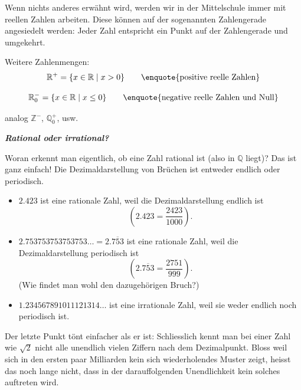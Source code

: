Wenn nichts anderes erwähnt wird, werden wir in der Mittelschule immer mit reellen Zahlen arbeiten. Diese können auf der sogenannten Zahlengerade angesiedelt werden: Jeder Zahl entspricht ein Punkt auf der Zahlengerade und umgekehrt.

\begin{center}
\end{center}

Weitere Zahlenmengen:
\[
    \mathbb{R}^{+}
    =
    \{x \in \mathbb{R} \mid x > 0\}
    \qquad
    \text{\enquote{positive reelle Zahlen}}
\]

\[
    \mathbb{R}^{-}_{0}
    =
    \{x \in \mathbb{R} \mid x \leq 0\}
    \qquad
    \text{\enquote{negative reelle Zahlen und Null}}
\]

analog \(\mathbb{Z}^{-}\), \(\mathbb{Q}^{+}_{0}\), usw.



\textbf{\textit{Rational oder irrational?}}

Woran erkennt man eigentlich, ob eine Zahl rational ist (also in \(\mathbb{Q}\) liegt)? Das ist ganz einfach! Die Dezimaldarstellung von Brüchen ist entweder endlich oder periodisch.

\begin{itemize}
    \item \(2.423\) ist eine rationale Zahl, weil die Dezimaldarstellung endlich ist
          \[
              \left(2.423 = \frac{2423}{1000}\right).
          \]

    \item \(2.753753753753753\ldots = 2.\overline{753}\) ist eine rationale Zahl, weil die Dezimaldarstellung periodisch ist
          \[
              \left(2.\overline{753} = \frac{2751}{999}\right).
          \]
          (Wie findet man wohl den dazugehörigen Bruch?)

    \item \(1.234567891011121314\ldots\) ist eine irrationale Zahl, weil sie weder endlich noch periodisch ist.
\end{itemize}

Der letzte Punkt tönt einfacher als er ist: Schliesslich kennt man bei einer Zahl wie \(\sqrt{2}\) nicht alle unendlich vielen Ziffern nach dem Dezimalpunkt. Bloss weil sich in den ersten paar Milliarden kein sich wiederholendes Muster zeigt, heisst das noch lange nicht, dass in der darauffolgenden Unendlichkeit kein solches auftreten wird.

